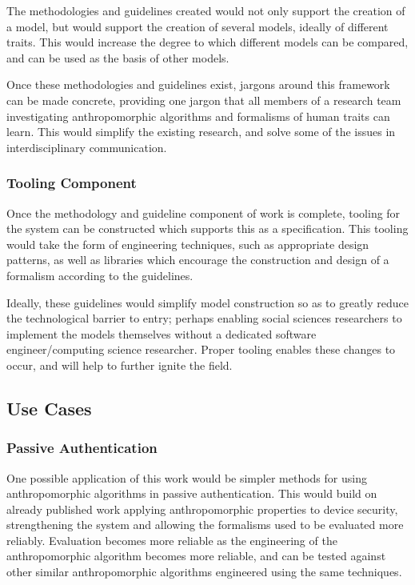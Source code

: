 The methodologies and guidelines created would not only support the creation of a model, but would support the creation of several models, ideally of different traits. This would increase the degree to which different models can be compared, and can be used as the basis of other models.\par

Once these methodologies and guidelines exist, jargons around this framework can be made concrete, providing one jargon that all members of a research team investigating anthropomorphic algorithms and formalisms of human traits can learn. This would simplify the existing research, and solve some of the issues in interdisciplinary communication.\par

\subsubsection*{Tooling Component}\label{sec:tooling}
Once the methodology and guideline component of work is complete, tooling for the system can be constructed which supports this as a specification. This tooling would take the form of engineering techniques, such as appropriate design patterns, as well as libraries which encourage the construction and design of a formalism according to the guidelines.\par

Ideally, these guidelines would simplify model construction so as to greatly reduce the technological barrier to entry; perhaps enabling social sciences researchers to implement the models themselves without a dedicated software engineer/computing science researcher. Proper tooling enables these changes to occur, and will help to further ignite the field.\par

\subsection{Use Cases}
\subsubsection*{Passive Authentication}
One possible application of this work would be simpler methods for using anthropomorphic algorithms in passive authentication. This would build on already published work applying anthropomorphic properties to device security\cite{Crawford2013127}, strengthening the system and allowing the formalisms used to be evaluated more reliably. Evaluation becomes more reliable as the engineering of the anthropomorphic algorithm becomes more reliable, and can be tested against other similar anthropomorphic algorithms engineered using the same techniques.\par

